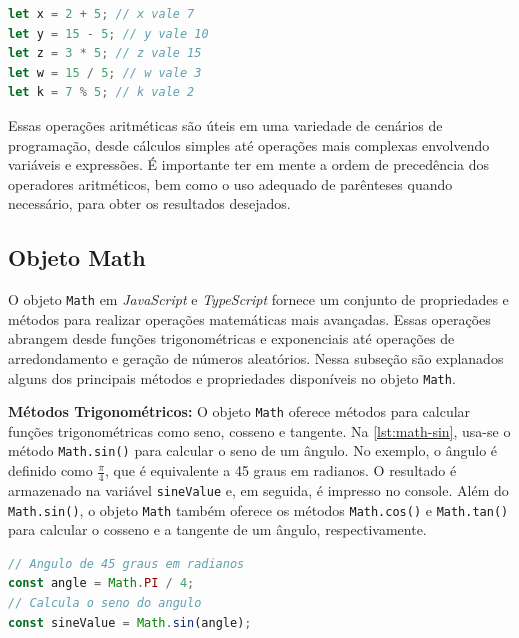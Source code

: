 \begin{lstlisting}[language=TypeScript, caption=Exemplos de Operações Aritméticas em \textit{JavaScript} e \textit{TypeScript}., label=lst:op-aritmeticas]
let x = 2 + 5; // x vale 7
let y = 15 - 5; // y vale 10
let z = 3 * 5; // z vale 15
let w = 15 / 5; // w vale 3
let k = 7 % 5; // k vale 2
\end{lstlisting}

Essas operações aritméticas são úteis em uma variedade de cenários de programação, desde cálculos simples até operações mais complexas envolvendo variáveis e expressões. É importante ter em mente a ordem de precedência dos operadores aritméticos, bem como o uso adequado de parênteses quando necessário, para obter os resultados desejados.


\subsection{Objeto Math}

O objeto \texttt{Math} em \textit{JavaScript} e \textit{TypeScript} fornece um conjunto de propriedades e métodos para realizar operações matemáticas mais avançadas. Essas operações abrangem desde funções trigonométricas e exponenciais até operações de arredondamento e geração de números aleatórios. Nessa subseção são explanados alguns dos principais métodos e propriedades disponíveis no objeto \texttt{Math}.

\textbf{Métodos Trigonométricos:} O objeto \texttt{Math} oferece métodos para calcular funções trigonométricas como seno, cosseno e tangente. Na \autoref{lst:math-sin}, usa-se o método \texttt{Math.sin()} para calcular o seno de um ângulo. No exemplo, o ângulo é definido como $\frac{\pi}{4}$, que é equivalente a 45 graus em radianos. O resultado é armazenado na variável \texttt{sineValue} e, em seguida, é impresso no console. Além do \texttt{Math.sin()}, o objeto \texttt{Math} também oferece os métodos \texttt{Math.cos()} e \texttt{Math.tan()} para calcular o cosseno e a tangente de um ângulo, respectivamente.

\Needspace{0.3\textheight}
\begin{lstlisting}[language=TypeScript, caption=Exemplo de uso do método \texttt{Math.sin()}., label=lst:math-sin]
// Angulo de 45 graus em radianos
const angle = Math.PI / 4; 
// Calcula o seno do angulo
const sineValue = Math.sin(angle); 
\end{lstlisting}



